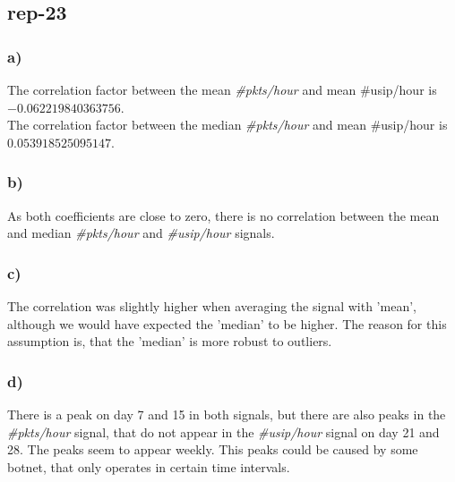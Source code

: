 \subsection*{rep-23}
\subsubsection*{a)}
The correlation factor between the mean \textit{\#pkts/hour} and mean \#usip/hour is $-0.062219840363756$. \\
The correlation factor between the median \textit{\#pkts/hour} and mean \#usip/hour is $0.053918525095147$.
\subsubsection*{b)}
As both coefficients are close to zero, there is no correlation between the mean and median  \textit{\#pkts/hour} and \textit{\#usip/hour} signals. 
\subsubsection*{c)}
The correlation was slightly higher when averaging the signal with 'mean', although we would have expected the 'median' to be higher. The reason for this assumption is, that the 'median' is more robust to outliers.
\subsubsection*{d)}
There is a peak on day 7 and 15 in both signals, but there are also peaks in the \textit{\#pkts/hour} signal, that do not appear in the \textit{\#usip/hour} signal on day 21 and 28. The peaks seem to appear weekly. This peaks could be caused by some botnet, that only operates in certain time intervals.